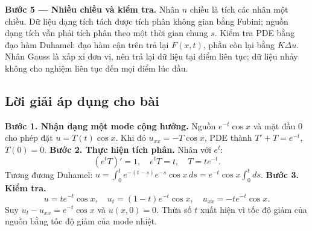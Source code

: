 \documentclass[10pt,a4paper]{article}
\begin{document}
\textbf{Bước 5 — Nhiều chiều và kiểm tra.} Nhân $n$ chiều là tích các nhân một chiều. Dữ liệu dạng tích tách được tích phân không gian bằng Fubini; nguồn dạng tích vẫn phải tích phân theo một thời gian chung $s$. Kiểm tra PDE bằng đạo hàm Duhamel: đạo hàm cận trên trả lại $F(x,t)$, phần còn lại bằng $K\Delta u$. Nhân Gauss là xấp xỉ đơn vị, nên trả lại dữ liệu tại điểm liên tục; dữ liệu nhảy không cho nghiệm liên tục đến mọi điểm lúc đầu.
\subsection*{Lời giải áp dụng cho bài}
\textbf{Bước 1. Nhận dạng một mode cộng hưởng.}
Nguồn $e^{-t}\cos x$ và mặt đầu $0$ cho phép đặt $u=T(t)\cos x$. Khi đó $u_{xx}=-T\cos x$, PDE thành $T'+T=e^{-t}$, $T(0)=0$.
\textbf{Bước 2. Thực hiện tích phân.} Nhân với $e^t$:
\[(e^tT)'=1,\quad e^tT=t,\quad T=te^{-t}.\]
Tương đương Duhamel: $u=\int_0^te^{-(t-s)}e^{-s}\cos x\,ds=e^{-t}\cos x\int_0^tds$.
\textbf{Bước 3. Kiểm tra.}
\[u=te^{-t}\cos x,\quad u_t=(1-t)e^{-t}\cos x,\quad
u_{xx}=-te^{-t}\cos x.\]
Suy $u_t-u_{xx}=e^{-t}\cos x$ và $u(x,0)=0$. Thừa số $t$ xuất hiện vì tốc độ giảm của nguồn bằng tốc độ giảm của mode nhiệt.
\end{document}

